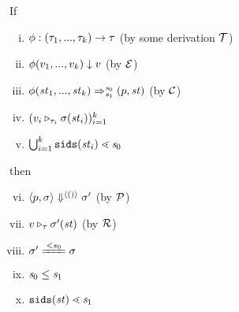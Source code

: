 \begin{lem}
	\label{function-correctness}
	If 
	\begin{enumerate}[(i)]
	\item $\Typef{\hcall}{\replc{k}{\tau}}\tau$ (by some derivation $\MT$)
	\item $\EvalF{\hcall}{\replc{k}{v}}{v}$ (by $\ME$)
	\item $\Transf{\hcall}{\replc k {\st}} {\s_0} {\s_1} {\sfun{p}{\st}}$ (by $\MC$)
 	\item $(\ValRep{v_i}{\tau_i}{\sgm(\st_i)})^k_{i=1}$
 	\item $\bigcup^k_{i=1}\sids{\st_i} \.< \s_0$
	\end{enumerate}
 	then 
 	\begin{enumerate}[(i)]
 		\setcounter{enumi}{5}
 		\item $\seval{p}{\sgm}{\vunit}{\sgm'}$ (by $\MP$)
 		\item $\ValRep{v}{\tau}{\sgm'(\st)}$ (by $\MR$)
 		\item $\sgm' \ConEq{s_0} \sgm $
 	    \item $\s_0 \le \s_1$
 		\item $\sids{\st} \.< \s_1$

 	\end{enumerate}
\end{lem}

